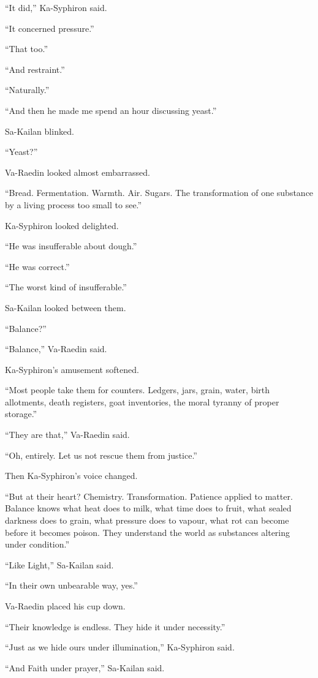 “It did,” Ka-Syphiron said.\par
“It concerned pressure.”\par
“That too.”\par
“And restraint.”\par
“Naturally.”\par
“And then he made me spend an hour discussing yeast.”\par
Sa-Kailan blinked.\par
“Yeast?”\par
Va-Raedin looked almost embarrassed.\par
“Bread. Fermentation. Warmth. Air. Sugars. The transformation of one substance by a living process too small to see.”\par
Ka-Syphiron looked delighted.\par
“He was insufferable about dough.”\par
“He was correct.”\par
“The worst kind of insufferable.”\par
Sa-Kailan looked between them.\par
“Balance?”\par
“Balance,” Va-Raedin said.\par
Ka-Syphiron’s amusement softened.\par
“Most people take them for counters. Ledgers, jars, grain, water, birth allotments, death registers, goat inventories, the moral tyranny of proper storage.”\par
“They are that,” Va-Raedin said.\par
“Oh, entirely. Let us not rescue them from justice.”\par
Then Ka-Syphiron’s voice changed.\par
“But at their heart? Chemistry. Transformation. Patience applied to matter. Balance knows what heat does to milk, what time does to fruit, what sealed darkness does to grain, what pressure does to vapour, what rot can become before it becomes poison. They understand the world as substances altering under condition.”\par
“Like Light,” Sa-Kailan said.\par
“In their own unbearable way, yes.”\par
Va-Raedin placed his cup down.\par
“Their knowledge is endless. They hide it under necessity.”\par
“Just as we hide ours under illumination,” Ka-Syphiron said.\par
“And Faith under prayer,” Sa-Kailan said.\par

